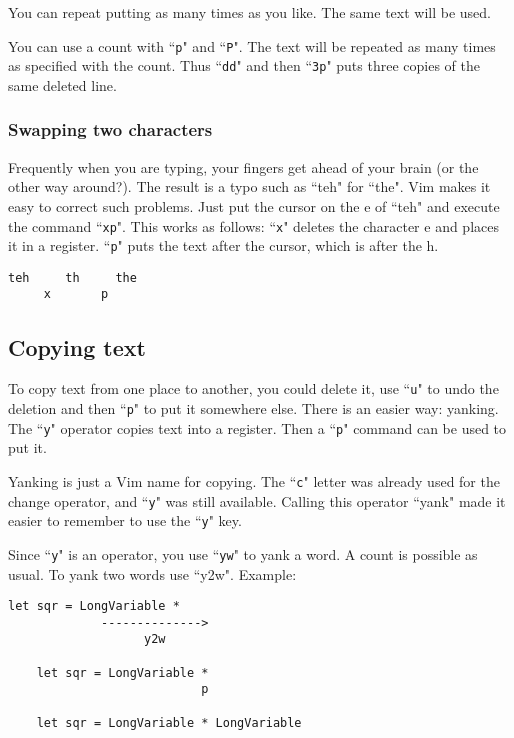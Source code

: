 You can repeat putting as many times as you like.
The same text will be used.

You can use a count with ``\texttt{p}" and ``\texttt{P}".
The text will be repeated as many times as specified with the count.
Thus ``\texttt{dd}" and then ``\texttt{3p}" puts three copies of the same deleted line.

\subsubsection{Swapping two characters}

Frequently when you are typing, your fingers get ahead of your brain (or the other way around?).
The result is a typo such as ``teh" for ``the".
Vim makes it easy to correct such problems.
Just put the cursor on the e of ``teh" and execute the command ``\texttt{xp}".
This works as follows: ``\texttt{x}" deletes the character e and places it in a register.
``\texttt{p}" puts the text after the cursor, which is after the h.

\begin{Verbatim}[samepage=true]
    teh     th     the
     x       p
\end{Verbatim}

\subsection{Copying text}

To copy text from one place to another, you could delete it, use ``\texttt{u}" to undo the deletion and then ``\texttt{p}" to put it somewhere else.
There is an easier way: yanking.
The ``\texttt{y}" operator copies text into a register.
Then a ``\texttt{p}" command can be used to put it.

Yanking is just a Vim name for copying.
The ``\texttt{c}" letter was already used for the change operator, and ``\texttt{y}" was still available.
Calling this operator ``yank" made it easier to remember to use the ``\texttt{y}" key.

Since ``\texttt{y}" is an operator, you use ``\texttt{yw}" to yank a word.
A count is possible as usual.
To yank two words use ``y2w".
Example:

\begin{Verbatim}[samepage=true]
    let sqr = LongVariable *
             -------------->
                   y2w

    let sqr = LongVariable *
                           p

    let sqr = LongVariable * LongVariable
\end{Verbatim}

